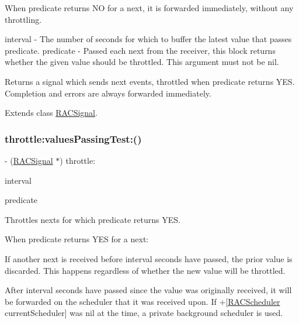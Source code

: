 When {\ttfamily predicate} returns NO for a {\ttfamily next}, it is forwarded immediately, without any throttling.

interval -\/ The number of seconds for which to buffer the latest value that passes {\ttfamily predicate}. predicate -\/ Passed each {\ttfamily next} from the receiver, this block returns whether the given value should be throttled. This argument must not be nil.

Returns a signal which sends {\ttfamily next} events, throttled when {\ttfamily predicate} returns Y\+ES. Completion and errors are always forwarded immediately. 

Extends class \mbox{\hyperlink{interface_r_a_c_signal_a0310fbee83b4ca1b1daca25daf24f41b}{R\+A\+C\+Signal}}.

\mbox{\label{category_r_a_c_signal_07_operations_08_a0310fbee83b4ca1b1daca25daf24f41b}} 
\subsubsection{\texorpdfstring{throttle\+:values\+Passing\+Test\+:()}{throttle:valuesPassingTest:()}\hspace{0.1cm}{\footnotesize\ttfamily [3/3]}}
{\footnotesize\ttfamily -\/ (\mbox{\hyperlink{interface_r_a_c_signal}{R\+A\+C\+Signal}} $\ast$) throttle\+: \begin{DoxyParamCaption}\item[{(N\+S\+Time\+Interval)}]{interval }\item[{valuesPassingTest:(B\+O\+OL($^\wedge$)(id next))}]{predicate }\end{DoxyParamCaption}}

Throttles {\ttfamily next}s for which {\ttfamily predicate} returns Y\+ES.

When {\ttfamily predicate} returns Y\+ES for a {\ttfamily next}\+:


\begin{DoxyEnumerate}
\item If another {\ttfamily next} is received before {\ttfamily interval} seconds have passed, the prior value is discarded. This happens regardless of whether the new value will be throttled.
\item After {\ttfamily interval} seconds have passed since the value was originally received, it will be forwarded on the scheduler that it was received upon. If +\mbox{[}\mbox{\hyperlink{interface_r_a_c_scheduler}{R\+A\+C\+Scheduler}} current\+Scheduler\mbox{]} was nil at the time, a private background scheduler is used.
\end{DoxyEnumerate}

